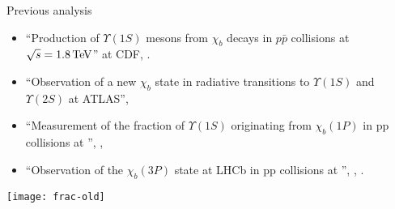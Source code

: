 \begin{frame}{Previous analysis}

\begin{itemize}
\item ``Production of $\Upsilon(1S)$ mesons from $\chi_b$ decays in $p\bar{p}$ collisions at $\sqrt{s} = 1.8\mathrm{\,Te\kern -0.1em V}$'' at CDF, .
\item ``Observation of a new $\chi_b$ state in radiative transitions to $\Upsilon(1S)$ and $\Upsilon(2S)$ at ATLAS'', 
\end{itemize}
\begin{itemize}
\item ``Measurement of the fraction of $\Upsilon(1S)$ originating from $\chi_b(1P)$ in pp collisions at \tev'', ,  \invpb
\item ``Observation of the $\chi_b(3P)$ state at LHCb in pp collisions at \tev'',
,  \invfb.
\end{itemize}

\centering
\texttt{[image: frac-old]}


\end{frame}
